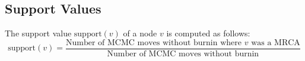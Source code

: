 \documentclass{llncs}
\begin{document}
\subsection{Support Values}
The support value $\text{support}(v)$ of a node $v$ is computed as follows:
$$\text{support}(v) = \frac{\text{Number of MCMC moves without burnin where $v$ was a MRCA}}{\text{Number of MCMC moves without burnin}}$$



\end{document}
